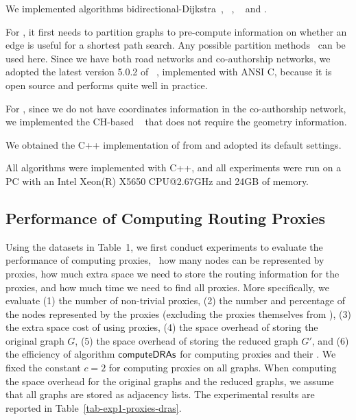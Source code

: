  We implemented algorithms bidirectional-Dijkstra~\cite{LubyR89}, \arcflag~\cite{MohringSSWW05}, \tnr~\cite{arz2013transit} and \ah \cite{zhu2013shortest}.

For \arcflag, it first needs to partition graphs to pre-compute information on whether an edge is useful for a shortest path search. Any possible partition methods~\cite{kl70,Karypis98,YangYZK12, delling2011graph} can be used here. Since we have both road networks and co-authorship networks, we adopted the latest version 5.0.2 of \metis~\cite{metis}, implemented with ANSI C, because it is open source and performs quite well in practice.

For \tnr, since we do not have coordinates information in the co-authorship network, we implemented the CH-based \tnr~\cite{arz2013transit} that does not require the geometry information.

We obtained the C++ implementation of \ah from \cite{zhu2013shortest} and adopted its default settings.



 All algorithms were implemented with C++, and
all experiments were run on a PC with an Intel Xeon(R) X5650 CPU@2.67GHz
and 24GB of memory.






\subsection{Performance of Computing Routing Proxies}
Using the datasets in Table~1, we first conduct experiments to evaluate the performance of computing proxies, \ie\ how many nodes can be represented by proxies, how much extra space we need to store the routing information for the proxies, and how much time we need to find all proxies. More specifically, we evaluate (1) the number of non-trivial proxies, (2) the number and percentage of the nodes represented by the proxies (excluding the proxies themselves from \dras), (3) the extra space cost of using proxies, (4) the space overhead of storing the original graph $G$, (5) the space overhead of storing the reduced graph $G'$, and (6) the efficiency of algorithm ${\mathsf{computeDRAs}}$ for computing proxies and their \dras. We fixed the constant $c = 2$ for computing proxies on all graphs. When computing the space overhead for the original graphs and the reduced graphs, we assume that all graphs are stored as adjacency lists. The experimental results are reported in Table~\ref{tab-exp1-proxies-dras}.

